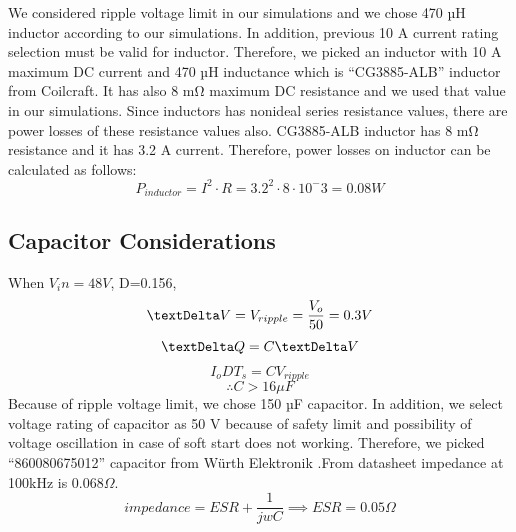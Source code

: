 \documentclass{article}
\begin{document}
We considered ripple voltage limit in our simulations and we chose 470 µH inductor according to our simulations. In addition, previous 10 A current rating selection must be valid for inductor. Therefore, we picked an inductor with 10 A maximum DC current and 470 µH inductance which is “CG3885-ALB” inductor from Coilcraft. It has also 8 mΩ maximum DC resistance and we used that value in our simulations.
Since inductors has nonideal series resistance values, there are power losses of these resistance values also. CG3885-ALB inductor has 8 mΩ resistance and it has 3.2 A current. Therefore, power losses on inductor can be calculated as follows:
\begin{equation}
    P_{inductor}=I^2\cdot R=3.2^2\cdot 8\cdot 10^-3=0.08W
\end{equation}

\subsection{Capacitor Considerations}
When $V_in=48 V$, D=0.156,
\begin{equation}
    \textDelta V=V_{ripple}=\frac{V_o}{50}=0.3V
\end{equation}
\begin{equation}
    \textDelta Q=C\textDelta V
\end{equation}
\begin{equation}
    I_oDT_s=CV_{ripple}
\end{equation}
\[\therefore C>16\mu F\]
Because of ripple voltage limit, we chose 150 µF capacitor. In addition, we select voltage rating of capacitor as 50 V because of safety limit and possibility of voltage oscillation in case of soft start does not working. Therefore, we picked “860080675012” capacitor from Würth Elektronik \cite{capacitor}.From datasheet impedance at 100kHz is $0.068\Omega$.
\begin{equation}
    impedance=ESR+\frac{1}{jwC} \implies ESR=0.05 \Omega
\end{equation}
\end{document}
